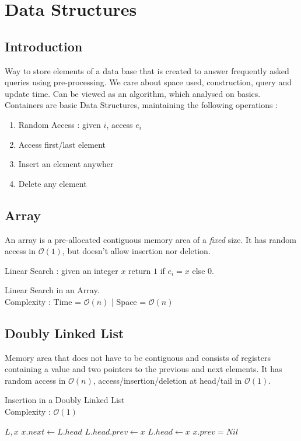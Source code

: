 \documentclass[12pt]{cours}
\begin{document}
\section{Data Structures}
\subsection{Introduction}
Way to store elements of a data base that is created to answer frequently asked queries using pre-processing.
We care about space used, construction, query and update time.
Can be viewed as an algorithm, which analysed on basics.
Containers are basic Data Structures, maintaining the following operations :
\begin{enumerate}
    \item Random Access : given $i$, access $e_{i}$
    \item Access first/last element
    \item Insert an element anywher
    \item Delete any element
\end{enumerate}

\subsection{Array}
An array is a pre-allocated contiguous memory area of a \emph{fixed} size. It has random access in $\mathcal{O}(1)$, but doesn't allow insertion nor deletion.

Linear Search : given an integer $x$ return $1$ if $e_{i} = x$ else 0.
\begin{algorithm}
    \caption{Linear Search in an Array. \\ Complexity : Time = $\mathcal{O}(n)$ | Space = $\mathcal{O}(n)$}
\end{algorithm}

\subsection{Doubly Linked List}
Memory area that does not have to be contiguous and consists of registers containing a value and two pointers to the previous and next elements.
It has random access in $\mathcal{O}(n)$, access/insertion/deletion at head/tail in $\mathcal{O}(1)$.
\begin{algorithm}
    \caption{Insertion in a Doubly Linked List \\ Complexity : $\mathcal{O}(1)$}
    \begin{algorithmic}
        \Input
        $ L, x$
        \EndInput
        \State $x.next \gets L.head$
        \State $L.head.prev \gets x$
        \EndIf
        \State $L.head \gets x$
        \State $x.prev = Nil$
    \end{algorithmic}
\end{algorithm}
\end{document}
